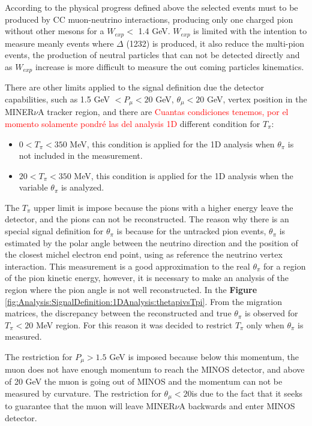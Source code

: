 According to the physical progress defined above the selected events must to be produced by CC muon-neutrino interactions, producing only one charged pion without other mesons for a $W_{exp} <$ 1.4 GeV. $W_{exp}$ is limited with the intention to measure meanly events where $\Delta$ (1232) is produced, it also reduce the multi-pion events, the production of neutral particles that can not be detected directly and as $W_{exp}$ increase is more difficult to measure the out coming particles kinematics. 

There are other limits applied to the signal definition due the detector capabilities, such as 1.5 GeV $<P_\mu<20$ GeV, $\theta_\mu<20$ GeV, vertex position in the MINER$\nu$A tracker region, and there are \textcolor{red}{Cuantas condiciones tenemos, por el momento solamente pondr\'e las del analysis 1D} different condition for $T_\pi$:
\begin{itemize}
    \item $0<T_\pi<350$ MeV, this condition is applied for the 1D analysis when $\theta_\pi$ is not included in the measurement.  
    \item $20<T_\pi<350$ MeV, this condition is applied for the 1D analysis when the variable $\theta_\pi$ is analyzed. 
\end{itemize}

The $T_\pi$ upper limit is impose because the pions with a higher energy leave the detector, and the pions can not be reconstructed. The reason why there is an special signal definition for $\theta_\pi$ is because for the untracked pion events, $\theta_\pi$ is estimated by the polar angle between the neutrino direction and the position of the closest michel electron end point, using as reference the neutrino vertex interaction. This measurement is a good approximation to the real $\theta_\pi$ for a region of the pion kinetic energy, however, it is necessary to make an analysis of the region where the pion angle is not well reconstructed. In the \textbf{Figure} \ref{fig:Analysis:SignalDefinition:1DAnalysis:thetapivsTpi}. From the migration matrices, the discrepancy between the reconstructed and true $\theta_\pi$ is observed for $T_\pi < 20$ MeV region. For this reason it was decided to restrict $T_\pi$ only when $\theta_\pi$ is measured. 

The restriction for $P_\mu>1.5$ GeV is imposed because below this momentum, the muon does not have enough momentum to reach the MINOS detector, and above of 20 GeV the muon is going out of MINOS and the momentum can not be measured by curvature. The restriction for $\theta_\mu < 20$\textdegree is due to the fact that it seeks to guarantee that the muon will leave MINER$\nu$A backwards and enter MINOS detector.

